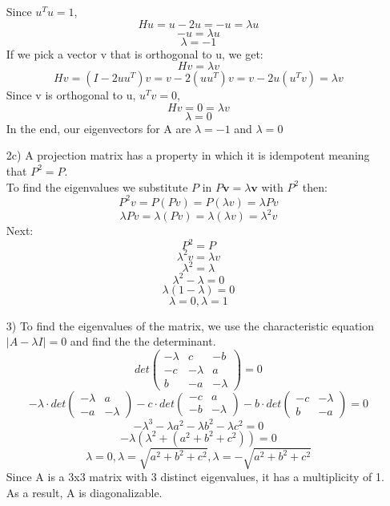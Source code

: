 \documentclass{article}
\begin{document}
\begin{enumerate}
                Since $u^Tu = 1$, 
                $$Hu = u - 2u = -u = \lambda u$$
                $$-u = \lambda u$$
                $$\lambda  = -1$$
            If we pick a vector v that is orthogonal to u, we get:
                $$Hv = \lambda v$$
                $$Hv = (I - 2uu^T)v = v - 2(uu^T)v = v - 2u(u^Tv) = \lambda v$$
                Since v is orthogonal to u, $u^Tv = 0$, 
                $$Hv = 0 = \lambda v$$
                $$\lambda  = 0$$
            In the end, our eigenvectors for A are $\lambda = -1$ and $\lambda = 0$
    \item[2c)] A projection matrix has a property in which it is idempotent meaning that $P^2 = P$. \\
            To find the eigenvalues we substitute $P$ in $P\textbf{v} = \lambda \textbf{v}$ with $P^2$ then:
                $$P^2v = P(Pv) = P(\lambda v) = \lambda Pv$$
                $$\lambda Pv = \lambda(Pv) = \lambda(\lambda v) = \lambda^2 v$$
            Next:
                $$P^2 = P$$
                $$\lambda^2v = \lambda v$$
                $$\lambda^2 = \lambda$$
                $$\lambda^2 - \lambda = 0$$
                $$\lambda(1 - \lambda) = 0$$
                $$\lambda = 0, \lambda = 1$$
    \item[3)] To find the eigenvalues of the matrix, we use the characteristic equation $|A - \lambda I| = 0$ and find the the determinant.
                $$det\begin{pmatrix}-\lambda & c & -b \\ -c & -\lambda & a\\ b & -a & -\lambda\end{pmatrix} = 0$$
                $$
                    -\lambda\cdot det\begin{pmatrix}-\lambda & a \\ -a & -\lambda\end{pmatrix}
                    -c \cdot det\begin{pmatrix}-c & a \\ -b & -\lambda\end{pmatrix}
                    -b \cdot det\begin{pmatrix}-c & -\lambda \\ b & -a\end{pmatrix}
                    = 0
                $$
                $$-\lambda^3 -\lambda a^2 -\lambda b^2 -\lambda c^2 = 0$$
                $$-\lambda(\lambda^2+(a^2+b^2+c^2)) = 0$$
                $$\lambda = 0, \lambda = \sqrt{a^2+b^2+c^2}, \lambda = -\sqrt{a^2+b^2+c^2}$$
            Since A is a 3x3 matrix with 3 distinct eigenvalues, it has a multiplicity of 1. As a result, A is diagonalizable.
    

\end{enumerate}
\end{document}
